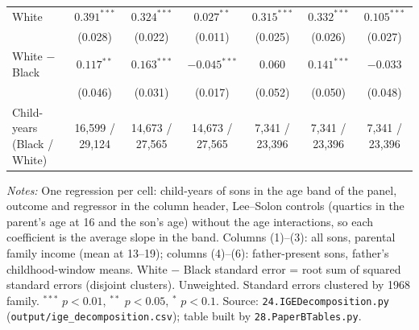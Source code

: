 \begin{table}[!htbp]
{{\begin{tabular}{lcccccc}
White & $0.391^{***}$ & $0.324^{***}$ & $0.027^{**}$ & $0.315^{***}$ & $0.332^{***}$ & $0.105^{***}$ \\
 & (0.028) & (0.022) & (0.011) & (0.025) & (0.026) & (0.027) \\
White $-$ Black & $0.117^{**}$ & $0.163^{***}$ & $-0.045^{***}$ & $0.060$ & $0.141^{***}$ & $-0.033$ \\
 & (0.046) & (0.031) & (0.017) & (0.052) & (0.050) & (0.048) \\
Child-years (Black / White) & 16,599 / 29,124 & 14,673 / 27,565 & 14,673 / 27,565 & 7,341 / 23,396 & 7,341 / 23,396 & 7,341 / 23,396 \\
\bottomrule
\end{tabular}}}
\par\smallskip
\begin{minipage}{\textwidth}\footnotesize \textit{Notes:} One regression per cell: child-years of sons in the age band of the panel, outcome and regressor in the column header, Lee--Solon controls (quartics in the parent's age at 16 and the son's age) without the age interactions, so each coefficient is the average slope in the band. Columns (1)--(3): all sons, parental family income (mean at 13--19); columns (4)--(6): father-present sons, father's childhood-window means. White $-$ Black standard error = root sum of squared standard errors (disjoint clusters). Unweighted. Standard errors clustered by 1968 family. $^{***}$ $p<0.01$, $^{**}$ $p<0.05$, $^{*}$ $p<0.1$. Source: \texttt{24.IGEDecomposition.py} (\texttt{output/ige\_decomposition.csv}); table built by \texttt{28.PaperBTables.py}.\end{minipage}
\end{table}
